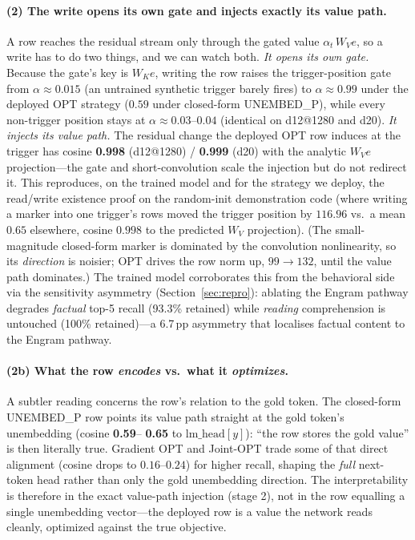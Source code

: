 \documentclass[letterpaper]{article} %
\begin{document}
\paragraph{(2) The write opens its own gate and injects exactly its
value path.} A row reaches the residual stream only through the
gated value $\alpha_t\,W_V e$, so a write has to do two things, and we
can watch both. \emph{It opens its own gate.} Because the gate's key
is $W_K e$, writing the row raises the trigger-position gate from
$\alpha\!\approx\!0.015$ (an untrained synthetic trigger barely
fires) to $\alpha\!\approx\!0.99$ under the deployed OPT strategy
($0.59$ under closed-form UNEMBED\_P), while every non-trigger
position stays at $\alpha\!\approx\!0.03$--$0.04$ (identical on
d12@1280 and d20). \emph{It injects its value path.} The residual
change the deployed OPT row induces at the trigger has cosine
\textbf{0.998} (d12@1280) / \textbf{0.999} (d20) with the analytic
$W_V e$ projection---the gate and short-convolution scale the
injection but do not redirect it. This reproduces, on the trained
model and for the strategy we deploy, the read/write existence proof
on the random-init demonstration code (where writing a marker into
one trigger's rows moved the trigger position by $116.96$ vs.\ a mean
$0.65$ elsewhere, cosine $0.998$ to the predicted $W_V$ projection). (The small-magnitude
closed-form marker is dominated by the convolution nonlinearity, so
its \emph{direction} is noisier; OPT drives the row norm up, $99\to
132$, until the value path dominates.) The trained model corroborates
this from the behavioral side via the sensitivity asymmetry
(Section~\ref{sec:repro}): ablating the Engram pathway degrades \emph{factual} top-5 recall
(93.3\% retained) while \emph{reading} comprehension is untouched
(100\% retained)---a 6.7\,pp asymmetry that localises factual content
to the Engram pathway.

\paragraph{(2b) What the row \emph{encodes} vs.\ what it
\emph{optimizes}.} A subtler reading concerns the row's relation to
the gold token. The closed-form UNEMBED\_P row points its value path
straight at the gold token's unembedding (cosine \textbf{0.59}--%
\textbf{0.65} to $\text{lm\_head}[y]$): ``the row stores the gold
value'' is then literally true. Gradient OPT and Joint-OPT trade some
of that direct alignment (cosine drops to $0.16$--$0.24$) for higher
recall, shaping the \emph{full} next-token head rather than only the
gold unembedding direction. The interpretability is therefore in the
exact value-path injection (stage 2), not in the row equalling a
single unembedding vector---the deployed row is a value the network
reads cleanly, optimized against the true objective.
\end{document}

